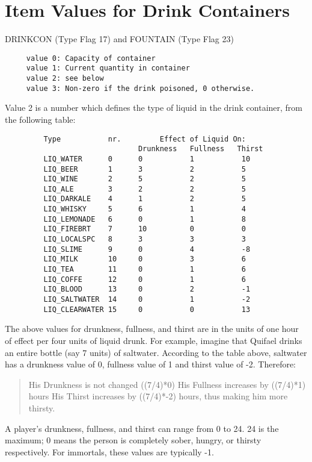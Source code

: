 \documentclass[11pt]{article}
\begin{document}
\section{Item Values for Drink Containers}
DRINKCON (Type Flag 17) and FOUNTAIN (Type Flag 23)
\begin{verbatim}
     value 0: Capacity of container
     value 1: Current quantity in container
     value 2: see below
     value 3: Non-zero if the drink poisoned, 0 otherwise.
\end{verbatim}
Value 2 is a number which defines the type of liquid in the drink container, from the following table:
\begin{verbatim}
         Type           nr.         Effect of Liquid On:
                               Drunkness   Fullness   Thirst
         LIQ_WATER      0      0           1           10
         LIQ_BEER       1      3           2           5
         LIQ_WINE       2      5           2           5
         LIQ_ALE        3      2           2           5
         LIQ_DARKALE    4      1           2           5
         LIQ_WHISKY     5      6           1           4
         LIQ_LEMONADE   6      0           1           8
         LIQ_FIREBRT    7      10          0           0
         LIQ_LOCALSPC   8      3           3           3
         LIQ_SLIME      9      0           4           -8
         LIQ_MILK       10     0           3           6
         LIQ_TEA        11     0           1           6
         LIQ_COFFE      12     0           1           6
         LIQ_BLOOD      13     0           2           -1
         LIQ_SALTWATER  14     0           1           -2
         LIQ_CLEARWATER 15     0           0           13
\end{verbatim}
The above values for drunkness, fullness, and thirst are in the units of one hour of effect per four units of liquid drunk.  For example, imagine that Quifael drinks an entire bottle (say 7 units) of saltwater. According to the table above, saltwater has a drunkness value of 0, fullness value of 1 and thirst value of -2.  Therefore:
\begin{quote}
His Drunkness is not changed ((7/4)*0)\newline
His Fullness increases by ((7/4)*1) hours\newline
His Thirst increases by ((7/4)*-2) hours, thus making him more thirsty.\newline
\end{quote}
A player's drunkness, fullness, and thirst can range from 0 to 24.  24 is the maximum; 0 means the person is completely sober, hungry, or thirsty respectively.  For immortals, these values are typically -1.
\end{document}
